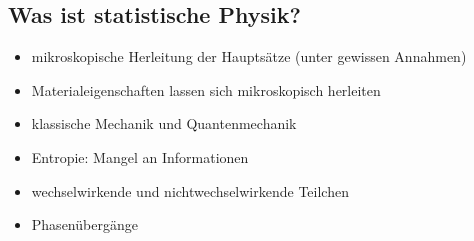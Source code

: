 \subsection{Was ist statistische Physik?}

\begin{itemize}
    \item mikroskopische Herleitung der Hauptsätze (unter gewissen Annahmen)
    \item Materialeigenschaften lassen sich  mikroskopisch herleiten
    \item klassische Mechanik und Quantenmechanik
    \item Entropie: Mangel an Informationen
    \item wechselwirkende und nichtwechselwirkende Teilchen
    \item Phasenübergänge
\end{itemize}

